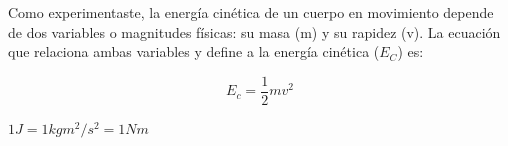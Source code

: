 \documentclass[11pt]{book}
\begin{document}
Como experimentaste, la energ\'ia cin\'etica de un cuerpo en movimiento depende de
dos variables o magnitudes f\'isicas: su masa (m) y su rapidez (v). La ecuaci\'on
que relaciona ambas variables y define a la energ\'ia cin\'etica ($E_C$) es:

\begin{equation*}
    E_c=\frac{1}{2}mv^2
\end{equation*}


\( 1 J = 1 kg m^2/s^2 = 1 Nm \)

\end{document}
